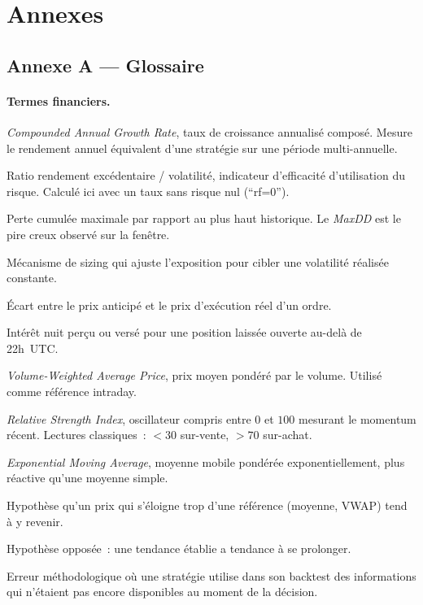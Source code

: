 \documentclass[11pt, a4paper]{scrartcl}
\begin{document}
\section{Annexes}
\label{sec:annex}

\subsection*{Annexe A --- Glossaire}

\paragraph{Termes financiers.}

\begin{description}[leftmargin=4.5cm, style=nextline]
\item[\textbf{CAGR}] \emph{Compounded Annual Growth Rate}, taux de croissance annualisé composé. Mesure le rendement annuel équivalent d'une stratégie sur une période multi-annuelle.
\item[\textbf{Sharpe ratio}] Ratio rendement excédentaire / volatilité, indicateur d'efficacité d'utilisation du risque. Calculé ici avec un taux sans risque nul (\enquote{rf=0}).
\item[\textbf{Drawdown (DD)}] Perte cumulée maximale par rapport au plus haut historique. Le \emph{MaxDD} est le pire creux observé sur la fenêtre.
\item[\textbf{Volatility targeting}] Mécanisme de sizing qui ajuste l'exposition pour cibler une volatilité réalisée constante.
\item[\textbf{Slippage}] Écart entre le prix anticipé et le prix d'exécution réel d'un ordre.
\item[\textbf{Swap rollover}] Intérêt nuit perçu ou versé pour une position laissée ouverte au-delà de 22h~UTC.
\item[\textbf{VWAP}] \emph{Volume-Weighted Average Price}, prix moyen pondéré par le volume. Utilisé comme référence intraday.
\item[\textbf{RSI}] \emph{Relative Strength Index}, oscillateur compris entre $0$ et $100$ mesurant le momentum récent. Lectures classiques~: $<30$ sur-vente, $>70$ sur-achat.
\item[\textbf{EMA}] \emph{Exponential Moving Average}, moyenne mobile pondérée exponentiellement, plus réactive qu'une moyenne simple.
\item[\textbf{Mean reversion}] Hypothèse qu'un prix qui s'éloigne trop d'une référence (moyenne, VWAP) tend à y revenir.
\item[\textbf{Trend following}] Hypothèse opposée~: une tendance établie a tendance à se prolonger.
\item[\textbf{Look-ahead bias}] Erreur méthodologique où une stratégie utilise dans son backtest des informations qui n'étaient pas encore disponibles au moment de la décision.
\end{description}
\end{document}
